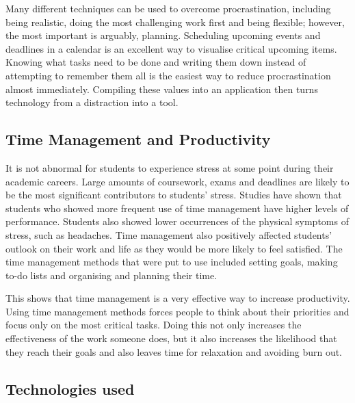 	            Many different techniques can be used to overcome procrastination, including being realistic, doing the most challenging work first and being flexible; however, the most important is arguably, planning\cite{overcome_procrastination_ferrari_2010}.  Scheduling upcoming events and deadlines in a calendar is an excellent way to visualise critical upcoming items.  Knowing what tasks need to be done and writing them down instead of attempting to remember them all is the easiest way to reduce procrastination almost immediately.  Compiling these values into an application then turns technology from a distraction into a tool.
	            
            \subsection{Time Management and Productivity}
	            It is not abnormal for students to experience stress at some point during their academic careers.  Large amounts of coursework, exams and deadlines are likely to be the most significant contributors to students' stress.  Studies have shown that students who showed more frequent use of time management have higher levels of performance.  Students also showed lower occurrences of the physical symptoms of stress, such as headaches.  Time management also positively affected students' outlook on their work and life as they would be more likely to feel satisfied.  The time management methods that were put to use included setting goals, making to-do lists and organising and planning their time\cite{TM_stress_macan_shahani_dipboye_phillips_1990}.
	            
	            This shows that time management is a very effective way to increase productivity.  Using time management methods forces people to think about their priorities and focus only on the most critical tasks.  Doing this not only increases the effectiveness of the work someone does, but it also increases the likelihood that they reach their goals and also leaves time for relaxation and avoiding burn out\cite{TM_productivity_luecke_2005}.
	            
            \subsection{Technologies used}
